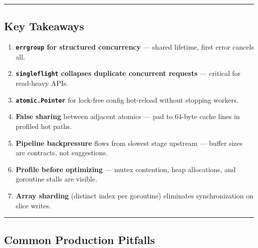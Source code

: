 \documentclass[
]{article}
\providecommand{\tightlist}{%
  \setlength{\itemsep}{0pt}\setlength{\parskip}{0pt}}
\begin{document}
\begin{center}\rule{0.5\linewidth}{0.5pt}\end{center}

\hypertarget{key-takeaways-3}{%
\subsection{Key Takeaways}\label{key-takeaways-3}}

\begin{enumerate}
\def\labelenumi{\arabic{enumi}.}
\tightlist
\item
  \textbf{\texttt{errgroup} for structured concurrency} --- shared
  lifetime, first error cancels all.
\item
  \textbf{\texttt{singleflight} collapses duplicate concurrent requests}
  --- critical for read-heavy APIs.
\item
  \textbf{\texttt{atomic.Pointer}} for lock-free config hot-reload
  without stopping workers.
\item
  \textbf{False sharing} between adjacent atomics --- pad to 64-byte
  cache lines in profiled hot paths.
\item
  \textbf{Pipeline backpressure} flows from slowest stage upstream ---
  buffer sizes are contracts, not suggestions.
\item
  \textbf{Profile before optimizing} --- mutex contention, heap
  allocations, and goroutine stalls are visible.
\item
  \textbf{Array sharding} (distinct index per goroutine) eliminates
  synchronization on slice writes.
\end{enumerate}

\begin{center}\rule{0.5\linewidth}{0.5pt}\end{center}

\hypertarget{common-production-pitfalls-3}{%
\subsection{Common Production
Pitfalls}\label{common-production-pitfalls-3}}
\end{document}
